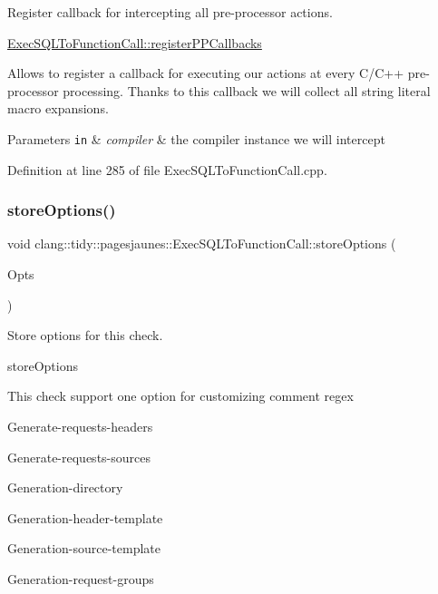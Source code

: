 Register callback for intercepting all pre-\/processor actions. 

\hyperlink{classclang_1_1tidy_1_1pagesjaunes_1_1_exec_s_q_l_to_function_call_a394eba23190a0f6e0b8cebdec7527ea9}{Exec\+S\+Q\+L\+To\+Function\+Call\+::register\+P\+P\+Callbacks}

Allows to register a callback for executing our actions at every C/\+C++ pre-\/processor processing. Thanks to this callback we will collect all string literal macro expansions.


\begin{DoxyParams}[1]{Parameters}
\mbox{\tt in}  & {\em compiler} & the compiler instance we will intercept \\
\hline
\end{DoxyParams}


Definition at line 285 of file Exec\+S\+Q\+L\+To\+Function\+Call.\+cpp.

\mbox{\label{classclang_1_1tidy_1_1pagesjaunes_1_1_exec_s_q_l_to_function_call_a632934107a0e957c3f07d61d6729f60e}} 
\subsubsection{\texorpdfstring{store\+Options()}{storeOptions()}}
{\footnotesize\ttfamily void clang\+::tidy\+::pagesjaunes\+::\+Exec\+S\+Q\+L\+To\+Function\+Call\+::store\+Options (\begin{DoxyParamCaption}\item[{Clang\+Tidy\+Options\+::\+Option\+Map \&}]{Opts }\end{DoxyParamCaption})\hspace{0.3cm}{\ttfamily [override]}}



Store options for this check. 

store\+Options

This check support one option for customizing comment regex
\begin{DoxyItemize}
\item Generate-\/requests-\/headers
\item Generate-\/requests-\/sources
\item Generation-\/directory
\item Generation-\/header-\/template
\item Generation-\/source-\/template
\item Generation-\/request-\/groups
\end{DoxyItemize}


